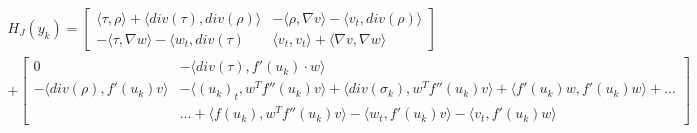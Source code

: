 \documentclass[a4paper, 11pt]{article}
\begin{document}
\begin{equation}
\begin{aligned}
H_J(y_k) = \begin{bmatrix}
\langle \tau, \rho \rangle + \langle div(\tau), div(\rho) \rangle & - \langle \rho, \nabla v \rangle - \langle v_t, div(\rho) \rangle  \\
- \langle \tau, \nabla w \rangle - \langle w_t, div(\tau)& \langle v_t, v_t \rangle + \langle \nabla v, \nabla w \rangle 
\end{bmatrix} \\
+ \begin{bmatrix}
0 & - \langle div(\tau), f'(u_k) \cdot w \rangle \\
- \langle div(\rho), f'(u_k) v \rangle & -\langle (u_k)_t, w^T f''(u_k) v \rangle + \langle div(\sigma_k), w^T f''(u_k) v \rangle + \langle f'(u_k)w , f'(u_k) w \rangle +... \\ &... + \langle f(u_k), w^T f''(u_k) v \rangle - \langle w_t, f'(u_k) v \rangle - \langle v_t, f'(u_k) w \rangle
\end{bmatrix}
\end{aligned}
\end{equation}
\end{document}

